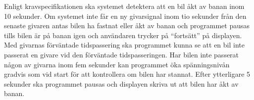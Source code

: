 Enligt kravspecifikationen ska systemet detektera att en bil åkt av banan inom
10 sekunder. Om systemet inte får en ny givarsignal inom tio sekunder från den
senaste givaren antas bilen ha fastnat eller åkt av banan och programmet pausas
tills bilen är på banan igen och användaren trycker på ``fortsätt'' på
displayen. Med givarnas förväntade tidspassering ska programmet kunna se att en
bil inte passerat en givare vid den förväntade tidspasseringen. Har bilen inte
passerat någon av givarna inom fem sekunder kan programmet öka spänningsnivån
gradvis som vid start för att kontrollera om bilen har stannat. Efter
ytterligare 5 sekunder ska programmet pausas och displayen skriva ut att bilen
har åkt av banan.

